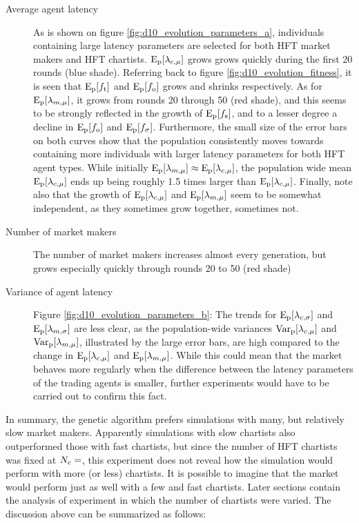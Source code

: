 \begin{description}
\item[Average agent latency]  As is shown on figure \ref{fig:d10_evolution_parameters_a}, individuals containing large latency parameters are selected for both HFT market makers and HFT chartists. $\mathrm{E}_\text{p}[\lambda_{c, \mu}]$ grows grows quickly during the first 20 rounds (blue shade). Referring back to figure \ref{fig:d10_evolution_fitness}, it is seen that $\mathrm{E}_\text{p}[f_\text{t}]$ and $\mathrm{E}_\text{p}[f_\text{o}]$ grows and shrinks respectively. As for $\mathrm{E}_\text{p}[\lambda_{m, \mu}]$, it grows from rounds 20 through 50 (red shade), and this  seems to be strongly reflected in the growth of $\mathrm{E}_\text{p}[f_\text{s}]$, and to a lesser degree a decline in $\mathrm{E}_\text{p}[f_\text{o}]$ and $\mathrm{E}_\text{p}[f_\sigma]$. Furthermore, the small size of the error bars on both curves show that the population consistently moves towards containing more individuals with larger latency parameters for both HFT agent types. While initially $\mathrm{E}_\text{p}[\lambda_{m, \mu}] \approx \mathrm{E}_\text{p}[\lambda_{c, \mu}]$, the population wide mean $\mathrm{E}_\text{p}[\lambda_{c, \mu}]$ ends up being roughly 1.5 times larger than $\mathrm{E}_\text{p}[\lambda_{c, \mu}]$. Finally, note also that the growth of  $\mathrm{E}_\text{p}[\lambda_{c, \mu}]$ and $\mathrm{E}_\text{p}[\lambda_{m, \mu}]$ seem to be somewhat independent, as they sometimes grow together, sometimes not.

\item[Number of market makers] The number of market makers increases almost every generation, but grows especially quickly through rounds 20 to 50 (red shade)

\item[Variance of agent latency] Figure \ref{fig:d10_evolution_parameters_b}: The trends for $\mathrm{E}_\text{p}[\lambda_{c, \sigma}]$ and $\mathrm{E}_\text{p}[\lambda_{m, \sigma}]$ are less clear, as the population-wide variances $\mathrm{Var}_\text{p}[\lambda_{c, \mu}]$ and $\mathrm{Var}_\text{p}[\lambda_{m, \mu}]$, illustrated by the large error bars, are high compared to the change in $\mathrm{E}_\text{p}[\lambda_{c, \mu}]$ and $\mathrm{E}_\text{p}[\lambda_{m, \mu}]$. While this could mean that the market behaves more regularly when the difference between the latency parameters of the trading agents is smaller, further experiments would have to be carried out to confirm this fact.
\end{description}

In summary, the genetic algorithm prefers simulations with many, but relatively slow market makers. Apparently simulations with slow chartists also outperformed those with fast chartists, but since the number of HFT chartists was fixed at $N_{c} = $, this experiment does not reveal how the simulation would perform with more (or less) chartists. It is possible to imagine that the market would perform just as well with a few and fast chartists. Later sections contain the analysis of experiment \deleven{} in which the number of chartists were varied. The discussion above can be summarized as follows:

